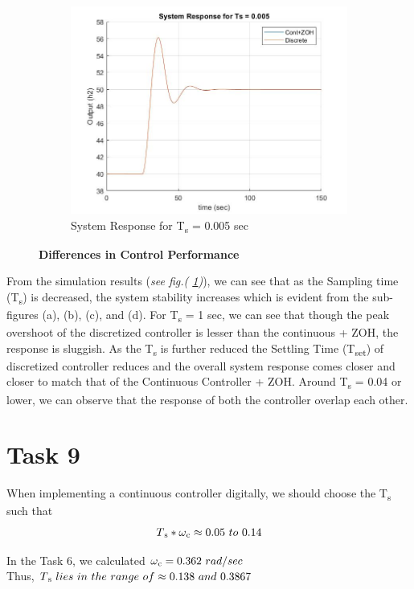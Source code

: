 \documentclass[a4paper,12pt,oneside,onecolumn]{article} %
\begin{document}
\begin{figure}[H]
\begin{subfigure}{0.4\textwidth}
  \includegraphics[width = \textwidth]{ex_8_7}
\caption{System Response for T\textsubscript{s} = 0.005 sec}
\end{subfigure}
\caption{\textbf{Differences in Control Performance}}
\label{fig:task8}
\end{figure}  

From the simulation results (\textit{see fig.( \ref{fig:task8})}), we can see that as the Sampling time (T\textsubscript{s}) is decreased, the system stability increases which is evident from the sub-figures (a), (b), (c), and (d). For T\textsubscript{s} = 1 sec, we can see that though the peak overshoot of the discretized controller is lesser than the continuous + ZOH, the response is sluggish. As the T\textsubscript{s} is further reduced the Settling Time (T\textsubscript{set}) of discretized controller reduces and the overall system response comes closer and closer to match that of the Continuous Controller + ZOH. Around T\textsubscript{s} = 0.04 or lower, we can observe that the response of both the controller overlap each other.

\section*{Task 9}

When implementing a continuous controller digitally, we should choose the T\textsubscript{s} such that
 \begin{align*}
 T\textsubscript{s}*\omega \textsubscript{c} \approx 0.05 \  to  \  0.14 
 \end{align*}
\begin{center}
In the Task 6, we calculated $\omega \textsubscript{c} = 0.362 \ rad/sec $ \\ 
Thus, $T\textsubscript{s} \ lies \ in \ the \ range \ of \approx 0.138 \ and \ 0.3867$
\end{center}
\end{document}
